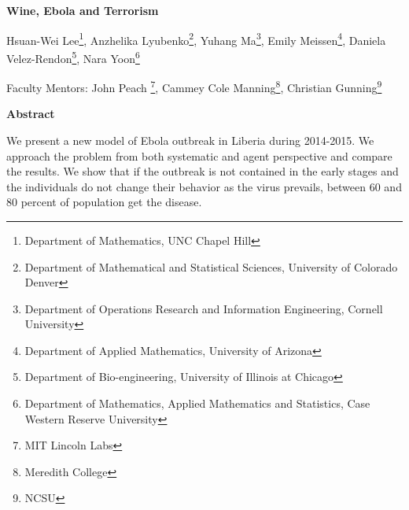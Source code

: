 \documentclass[10pt]{article}
\begin{document}
 

%
%
%
%
%
%
%
%
%

\centerline{\large \bf Wine, Ebola and Terrorism}

\vspace{.1truein}

\def\thefootnote{\arabic{footnote}}
\begin{center}
  Hsuan-Wei Lee\footnote{Department of Mathematics, UNC Chapel Hill},
  Anzhelika Lyubenko\footnote{Department of Mathematical and Statistical Sciences, University of Colorado Denver},
  Yuhang Ma\footnote{Department of Operations Research and Information Engineering, Cornell University},
  Emily Meissen\footnote{Department of Applied Mathematics, University of Arizona},
  Daniela Velez-Rendon\footnote{Department of Bio-engineering, University of Illinois at Chicago},
    Nara Yoon\footnote{
Department of Mathematics, Applied Mathematics and Statistics, Case Western Reserve University}
\end{center}


\begin{center}
Faculty Mentors: John Peach \footnote{MIT Lincoln Labs}, Cammey Cole Manning\footnote{Meredith College},
Christian Gunning\footnote{NCSU}
\end{center}
%
%
%
%
%
%
%
%
%

\vspace{.3truein}
\centerline{\bf Abstract}

We present a new model of Ebola outbreak in Liberia during 2014-2015. We approach the problem from both systematic and agent perspective and compare the results. We show that if the outbreak is not contained in the early stages and the individuals do not change their behavior as the virus prevails, between 60 and 80 percent of population get the disease. 

%
%
%
%
%
%
%
%
%
\end{document}
